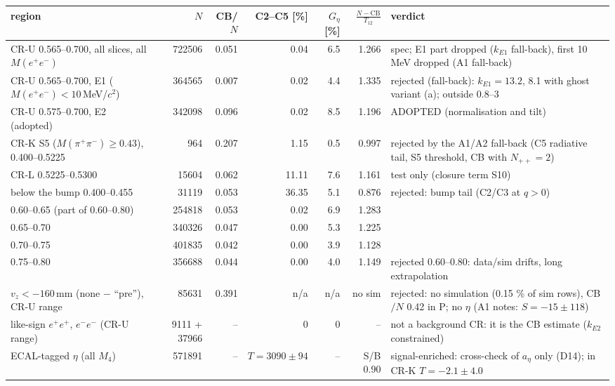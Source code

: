 \begin{tabular}{p{5.2cm}rrrrrp{5.6cm}}
\toprule
region & $N$ & CB/$N$ & C2--C5 [\%] & $G_\eta$ [\%] & $\frac{N-\mathrm{CB}}{T_{12}}$ & verdict \\
\midrule
CR-U 0.565--0.700, all slices, all $M(e^+e^-)$ & 722506 & 0.051 & 0.04 & 6.5 & 1.266 & spec; E1 part dropped ($k_{E1}$ fall-back), first 10 MeV dropped (A1 fall-back) \\
CR-U 0.565--0.700, E1 ($M(e^+e^-)<10$\,MeV/$c^2$) & 364565 & 0.007 & 0.02 & 4.4 & 1.335 & rejected (fall-back): $k_{E1}=13.2$, 8.1 with ghost variant (a); outside 0.8--3 \\
CR-U 0.575--0.700, E2 (adopted) & 342098 & 0.096 & 0.02 & 8.5 & 1.196 & ADOPTED (normalisation and tilt) \\
CR-K S5 ($M(\pi^+\pi^-)\geq0.43$), 0.400--0.5225 & 964 & 0.207 & 1.15 & 0.5 & 0.997 & rejected by the A1/A2 fall-back (C5 radiative tail, S5 threshold, CB with $N_{++}=2$) \\
CR-L 0.5225--0.5300 & 15604 & 0.062 & 11.11 & 7.6 & 1.161 & test only (closure term S10) \\
below the bump 0.400--0.455 & 31119 & 0.053 & 36.35 & 5.1 & 0.876 & rejected: bump tail (C2/C3 at $q>0$) \\
0.60--0.65 (part of 0.60--0.80) & 254818 & 0.053 & 0.02 & 6.9 & 1.283 &  \\
0.65--0.70 & 340326 & 0.047 & 0.00 & 5.3 & 1.225 &  \\
0.70--0.75 & 401835 & 0.042 & 0.00 & 3.9 & 1.128 &  \\
0.75--0.80 & 356688 & 0.044 & 0.00 & 4.0 & 1.149 & rejected 0.60--0.80: data/sim drifts, long extrapolation \\
$v_z<-160$\,mm (none $-$ ``pre''), CR-U range & 85631 & 0.391 & n/a & n/a & no sim & rejected: no simulation (0.15 \% of sim rows), CB$/N$ 0.42 in P; no $\eta$ (A1 notes: $S=-15\pm118$) \\
like-sign $e^+e^+$, $e^-e^-$ (CR-U range) & 9111 + 37966 & -- & 0 & 0 & -- & not a background CR: it is the CB estimate ($k_{E2}$ constrained) \\
ECAL-tagged $\eta$ (all $M_4$) & 571891 & -- & $T=3090\pm94$ & -- & S/B 0.90 & signal-enriched: cross-check of $a_\eta$ only (D14); in CR-K $T=-2.1\pm4.0$ \\
\bottomrule
\end{tabular}
